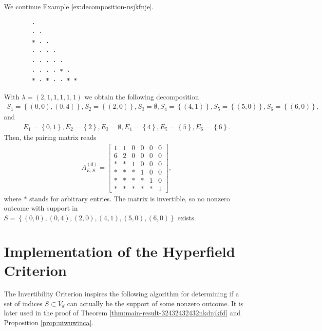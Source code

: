 \begin{example}
    We continue Example \ref{ex:decomposition-nsjkfnje}. 
    \begin{verbatim}
        · 
        · · 
        * · · 
        · · · · 
        · · · · · 
        · · · · * · 
        * · * · · * *
    \end{verbatim}
    With \( \lambda = (2,1,1,1,1,1) \) we obtain the following decomposition
    \begin{align*}
        S_1 = \left\{ (0,0), (0,4) \right\}, S_2 = \left\{ (2,0) \right\}, S_3 = \emptyset, S_4 = \left\{ (4,1) \right\}, S_5 = \left\{ (5,0) \right\}, S_6 = \left\{ (6,0) \right\},
    \end{align*}
    and
    \begin{align*}
        E_1 = \left\{ 0, 1 \right\}, E_2 = \left\{ 2 \right\}, E_3 = \emptyset, E_4 = \left\{ 4 \right\}, E_5 = \left\{ 5 \right\}, E_6 = \left\{ 6 \right\}.
    \end{align*}
    Then, the pairing matrix reads 
    \begin{align*}
        A^{(d)}_{E,S} = \begin{bmatrix}
            1 & 1 & 0 & 0 & 0 & 0 \\
            6 & 2 & 0 & 0 & 0 & 0 \\
            * & * & 1 & 0 & 0 & 0 \\
            * & * & * & 1 & 0 & 0 \\
            * & * & * & * & 1 & 0 \\
            * & * & * & * & * & 1
        \end{bmatrix},
    \end{align*}
    where \( * \) stands for arbitrary entries. The matrix is invertible, so no nonzero outcome with support in \( S = \left\{ (0,0), (0,4), (2,0), (4,1), (5,0), (6,0) \right\} \) exists.
\end{example}

\section{Implementation of the Hyperfield Criterion}

The Invertibility Criterion inspires the following algorithm for determining if a set of indices \( S \subset V_d \) can actually be the support of some nonzero outcome. It is later used in the proof of Theorem \ref{thm:main-result-32432432432nkdnjkfd} and Proposition \ref{prop:uiwuwinca}.

